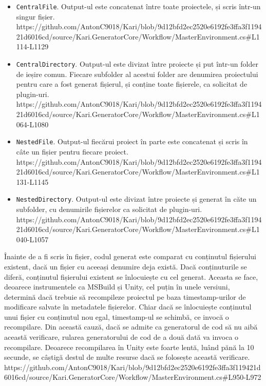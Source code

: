 \documentclass[a4paper,12pt]{report}
\begin{document}
\begin{itemize}
\item \texttt{CentralFile}. Output-ul este concatenat între toate proiectele, și scris într-un singur fișier.
  https://github.com/AntonC9018/Kari/blob/9d12bfd2ec2520e6192fe3ffa3f119421d6016cd/source/Kari.GeneratorCore/Workflow/MasterEnvironment.cs#L1114-L1129

\item \texttt{CentralDirectory}. Output-ul este divizat între proiecte și put într-un folder de ieșire comun.
  Fiecare subfolder al acestui folder are denumirea proiectului pentru care a fost generat fișierul, și conține toate fișierele, ca solicitat de plugin-uri.
  https://github.com/AntonC9018/Kari/blob/9d12bfd2ec2520e6192fe3ffa3f119421d6016cd/source/Kari.GeneratorCore/Workflow/MasterEnvironment.cs#L1064-L1080

\item \texttt{NestedFile}. Output-ul fiecărui proiect în parte este concatenat și scris în câte un fișier pentru fiecare proiect.
  https://github.com/AntonC9018/Kari/blob/9d12bfd2ec2520e6192fe3ffa3f119421d6016cd/source/Kari.GeneratorCore/Workflow/MasterEnvironment.cs#L1131-L1145

\item \texttt{NestedDirectory}. Output-ul este divizat între proiecte și generat în căte un subfolder, cu denumirile fișierelor ca solicitat de plugin-uri.
  https://github.com/AntonC9018/Kari/blob/9d12bfd2ec2520e6192fe3ffa3f119421d6016cd/source/Kari.GeneratorCore/Workflow/MasterEnvironment.cs#L1040-L1057
\end{itemize}

Înainte de a fi scris în fișier, codul generat este comparat cu conținutul fișierului existent, dacă un fișier cu aceeași denumire deja există.
Dacă conținuturile se diferă, conținutul fișierului existent se înlocuiește cu cel generat.
Aceasta se face, deoarece instrumentele ca MSBuild și Unity, cel puțin în unele versiuni, determină dacă trebuie să recompileze proiectul pe baza timestamp-urilor de modificare salvate în metadatele fișierelor.
Chiar dacă se înlocuiește conținutul unui fișier cu conținutul nou egal, timestamp-ul se schimbă, ce invocă o recompilare.
Din această cauză, dacă se admite ca generatorul de cod să nu aibă această verificare, rularea generatorului de cod de a două dată va invoca o recompilare.
Deoarece recompilarea în Unity este foarte lentă, luând pănă la 10 secunde, se câștigă destul de multe resurse dacă se folosește această verificare.
https://github.com/AntonC9018/Kari/blob/9d12bfd2ec2520e6192fe3ffa3f119421d6016cd/source/Kari.GeneratorCore/Workflow/MasterEnvironment.cs#L950-L972
\end{document}

